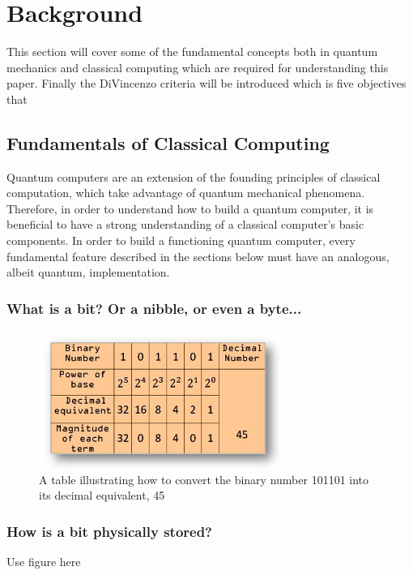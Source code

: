 \section{Background}

This section will cover some of the fundamental concepts both in quantum mechanics and classical computing which are required for understanding this paper. 
Finally the DiVincenzo criteria will be introduced which is five objectives that 


\subsection{Fundamentals of Classical Computing}
Quantum computers are an extension of the founding principles of classical computation, which take advantage of quantum mechanical phenomena. Therefore, in order to understand how to build a quantum computer, it is beneficial to have a strong understanding of a classical computer's basic components. In order to build a functioning quantum computer, every fundamental feature described in the sections below must have an analogous, albeit quantum, implementation.
\subsubsection{What is a bit? Or a nibble, or even a byte...}
\begin{figure}[H]
    \centering
    \includegraphics[width=0.7\textwidth]{images/binary.jpg}
    \caption{A table illustrating how to convert the binary number 101101 into its decimal equivalent, 45 \cite{binary}}\label{fig:BINARY}
\end{figure}
\subsubsection{How is a bit physically stored?}
Use figure here
